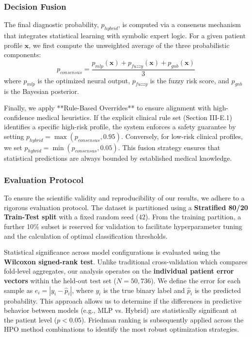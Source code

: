 \documentclass[conference]{IEEEtran}
\newcommand{\bx}{\mathbf{x}}
\begin{document}
\subsubsection{Decision Fusion}
The final diagnostic probability, $p_{hybrid}$, is computed via a consensus mechanism that integrates statistical learning with symbolic expert logic. For a given patient profile $\bx$, we first compute the unweighted average of the three probabilistic components:
\begin{equation}
    p_{consensus} = \frac{p_{mlp}(\bx) + p_{fuzzy}(\bx) + p_{gnb}(\bx)}{3}
\end{equation}
where $p_{mlp}$ is the optimized neural output, $p_{fuzzy}$ is the fuzzy risk score, and $p_{gnb}$ is the Bayesian posterior.

Finally, we apply **Rule-Based Overrides** to ensure alignment with high-confidence medical heuristics. If the explicit clinical rule set (Section III-E.1) identifies a specific high-risk profile, the system enforces a safety guarantee by setting $p_{hybrid} = \max(p_{consensus}, 0.95)$. Conversely, for low-risk clinical profiles, we set $p_{hybrid} = \min(p_{consensus}, 0.05)$. This fusion strategy ensures that statistical predictions are always bounded by established medical knowledge.

\subsubsection{Evaluation Protocol}
 To ensure the scientific validity and reproducibility of our results, we adhere to a rigorous evaluation protocol. The dataset is partitioned using a \textbf{Stratified 80/20 Train-Test split} with a fixed random seed ($42$). From the training partition, a further 10\% subset is reserved for validation to facilitate hyperparameter tuning and the calculation of optimal classification thresholds.

 Statistical significance across model configurations is evaluated using the \textbf{Wilcoxon signed-rank test}. Unlike traditional cross-validation which compares fold-level aggregates, our analysis operates on the \textbf{individual patient error vectors} within the held-out test set ($N=50,736$). We define the error for each sample as $e_i = |y_i - \hat{p}_i|$, where $y_i$ is the true binary label and $\hat{p}_i$ is the predicted probability. This approach allows us to determine if the differences in predictive behavior between models (e.g., MLP vs. Hybrid) are statistically significant at the patient level ($p < 0.05$). Friedman ranking is subsequently applied across the HPO method combinations to identify the most robust optimization strategies.
\end{document}
